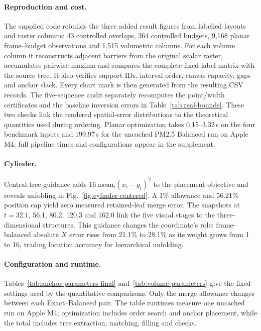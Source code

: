 \documentclass[review]{vgtc}
\begin{document}
\paragraph{Reproduction and cost.} The supplied code rebuilds the three added result figures from labelled layouts and raster columns: 43 controlled overlaps, 364 controlled budgets, 9,168 planar frame--budget observations and 1,515 volumetric columns. For each volume column it reconstructs adjacent barriers from the original scalar raster, accumulates pairwise maxima and compares the complete fixed-label matrix with the source tree. It also verifies support IDs, interval order, canvas capacity, gaps and anchor slack. Every chart mark is then generated from the resulting CSV records. The five-sequence audit separately recomputes the point/width certificates and the baseline inversion errors in Table~\ref{tab:real-bounds}. These two checks link the rendered spatial-error distributions to the theoretical quantities used during ordering. Planar optimization takes 0.15--3.32\,s on the four benchmark inputs and 199.97\,s for the uncached PM2.5 Balanced run on Apple M4; full pipeline times and configurations appear in the supplement.








\paragraph{Cylinder.}\label{sec:centered-volume} Central-tree guidance adds $16\,\mathrm{mean}_i(x_i-g_i)^2$ to the placement objective and reveals unfolding in Fig.~\ref{fig:cylinder-centered}. A 1\% allowance and 56.21\% position cap yield zero measured retained-leaf merge error. The snapshots at $t=32.1$, 56.1, 80.2, 120.3 and 162.0 link the five visual stages to the three-dimensional structures. This guidance changes the coordinate's role: frame-balanced absolute $X$ error rises from 21.1\% to 28.1\% as its weight grows from 1 to 16, trading location accuracy for hierarchical unfolding.

\paragraph{Configuration and runtime.} Tables~\ref{tab:anchor-parameters-final} and~\ref{tab:volume-parameters} give the fixed settings used by the quantitative comparisons. Only the merge allowance changes between each Exact--Balanced pair. The table runtimes measure one uncached run on Apple M4; optimization includes order search and anchor placement, while the total includes tree extraction, matching, filling and checks.


\end{document}
